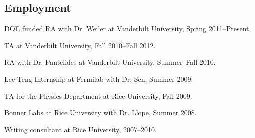 \documentclass[letterpaper]{article}
\renewenvironment{itemize}{
\begin{list}{}{
\setlength{\leftmargin}{1.5em}
}
}{
\end{list}
}
\begin{document}
\subsection*{Employment}
\begin{itemize}
\item DOE funded RA with Dr. Weiler at Vanderbilt University, Spring 2011--Present.
\item TA at Vanderbilt University, Fall 2010--Fall 2012.
\item RA with Dr. Pantelides at Vanderbilt University, Summer--Fall 2010.
\item Lee Teng Internship at Fermilab with Dr. Sen, Summer 2009.
\item TA for the Physics Department at Rice University, Fall 2009.
\item Bonner Labs at Rice University with Dr. Llope, Summer 2008.
\item Writing consultant at Rice University, 2007--2010.
\end{itemize}
\end{document}
